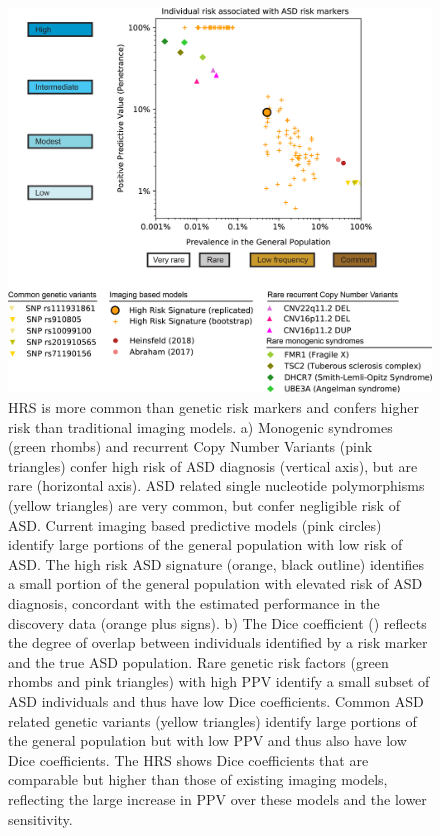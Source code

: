 \documentclass[9pt,lineno]{elife}
\begin{document}
\begin{figure}
\includegraphics[width=\linewidth]{fig2_model}
    \caption{HRS is more common than genetic risk markers and confers higher risk than traditional imaging models. a) Monogenic syndromes (green rhombs) and recurrent Copy Number Variants (pink triangles) confer high risk of ASD diagnosis (vertical axis), but are rare (horizontal axis). ASD related single nucleotide polymorphisms (yellow triangles) are very common, but confer negligible risk of ASD. Current imaging based predictive models (pink circles) identify large portions of the general population with low risk of ASD. The high risk ASD signature (orange, black outline) identifies a small portion of the general population with elevated risk of ASD diagnosis, concordant with the estimated performance in the discovery data (orange plus signs). b) The Dice coefficient () reflects the degree of overlap between individuals identified by a risk marker and the true ASD population. Rare genetic risk factors (green rhombs and pink triangles) with high PPV identify a small subset of ASD individuals and thus have low Dice coefficients. Common ASD related genetic variants (yellow triangles) identify large portions of the general population but with low PPV and thus also have low Dice coefficients. The HRS shows Dice coefficients that are comparable but higher than those of existing imaging models, reflecting the large increase in PPV over these models and the lower sensitivity.}
\label{fig:2_model}
\end{figure}
\end{document}
